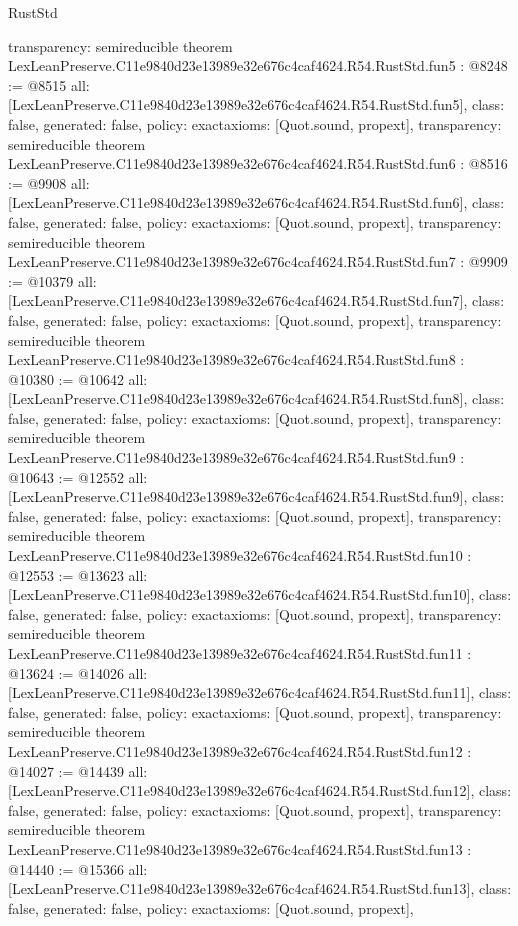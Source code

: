 \begin{lexlean}{RustStd}
\begin{coremodule}
{  transparency: semireducible
}
theorem LexLeanPreserve.C11e9840d23e13989e32e676c4caf4624.R54.RustStd.fun5 : @8248 := @8515 {
  all: [LexLeanPreserve.C11e9840d23e13989e32e676c4caf4624.R54.RustStd.fun5],
  class: false,
  generated: false,
  policy: exact{axioms: [Quot.sound, propext]},
  transparency: semireducible
}
theorem LexLeanPreserve.C11e9840d23e13989e32e676c4caf4624.R54.RustStd.fun6 : @8516 := @9908 {
  all: [LexLeanPreserve.C11e9840d23e13989e32e676c4caf4624.R54.RustStd.fun6],
  class: false,
  generated: false,
  policy: exact{axioms: [Quot.sound, propext]},
  transparency: semireducible
}
theorem LexLeanPreserve.C11e9840d23e13989e32e676c4caf4624.R54.RustStd.fun7 : @9909 := @10379 {
  all: [LexLeanPreserve.C11e9840d23e13989e32e676c4caf4624.R54.RustStd.fun7],
  class: false,
  generated: false,
  policy: exact{axioms: [Quot.sound, propext]},
  transparency: semireducible
}
theorem LexLeanPreserve.C11e9840d23e13989e32e676c4caf4624.R54.RustStd.fun8 : @10380 := @10642 {
  all: [LexLeanPreserve.C11e9840d23e13989e32e676c4caf4624.R54.RustStd.fun8],
  class: false,
  generated: false,
  policy: exact{axioms: [Quot.sound, propext]},
  transparency: semireducible
}
theorem LexLeanPreserve.C11e9840d23e13989e32e676c4caf4624.R54.RustStd.fun9 : @10643 := @12552 {
  all: [LexLeanPreserve.C11e9840d23e13989e32e676c4caf4624.R54.RustStd.fun9],
  class: false,
  generated: false,
  policy: exact{axioms: [Quot.sound, propext]},
  transparency: semireducible
}
theorem LexLeanPreserve.C11e9840d23e13989e32e676c4caf4624.R54.RustStd.fun10 : @12553 := @13623 {
  all: [LexLeanPreserve.C11e9840d23e13989e32e676c4caf4624.R54.RustStd.fun10],
  class: false,
  generated: false,
  policy: exact{axioms: [Quot.sound, propext]},
  transparency: semireducible
}
theorem LexLeanPreserve.C11e9840d23e13989e32e676c4caf4624.R54.RustStd.fun11 : @13624 := @14026 {
  all: [LexLeanPreserve.C11e9840d23e13989e32e676c4caf4624.R54.RustStd.fun11],
  class: false,
  generated: false,
  policy: exact{axioms: [Quot.sound, propext]},
  transparency: semireducible
}
theorem LexLeanPreserve.C11e9840d23e13989e32e676c4caf4624.R54.RustStd.fun12 : @14027 := @14439 {
  all: [LexLeanPreserve.C11e9840d23e13989e32e676c4caf4624.R54.RustStd.fun12],
  class: false,
  generated: false,
  policy: exact{axioms: [Quot.sound, propext]},
  transparency: semireducible
}
theorem LexLeanPreserve.C11e9840d23e13989e32e676c4caf4624.R54.RustStd.fun13 : @14440 := @15366 {
  all: [LexLeanPreserve.C11e9840d23e13989e32e676c4caf4624.R54.RustStd.fun13],
  class: false,
  generated: false,
  policy: exact{axioms: [Quot.sound, propext]},
}
\end{coremodule}
\end{lexlean}
